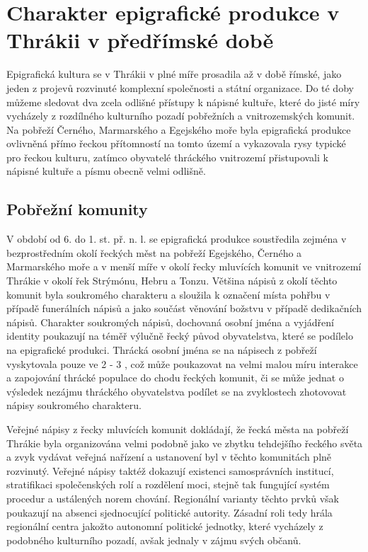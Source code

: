 \section[charakter-epigrafické-produkce-v-thrákii-v-předřímské-době]{Charakter epigrafické produkce v Thrákii v předřímské době}

Epigrafická kultura se v Thrákii v plné míře prosadila až v době římské, jako jeden z projevů rozvinuté komplexní společnosti a státní organizace. Do té doby můžeme sledovat dva zcela odlišné přístupy k nápisné kultuře, které do jisté míry vycházely z rozdílného kulturního pozadí pobřežních a vnitrozemských komunit. Na pobřeží Černého, Marmarského a Egejského moře byla epigrafická produkce ovlivněná přímo řeckou přítomností na tomto území a vykazovala rysy typické pro řeckou kulturu, zatímco obyvatelé thráckého vnitrozemí přistupovali k nápisné kultuře a písmu obecně velmi odlišně.

\subsection[pobřežní-komunity]{Pobřežní komunity}

V období od 6. do 1. st. př. n. l. se epigrafická produkce soustředila zejména v bezprostředním okolí řeckých měst na pobřeží Egejského, Černého a Marmarského moře a v menší míře v okolí řecky mluvících komunit ve vnitrozemí Thrákie v okolí řek Strýmónu, Hebru a Tonzu. Většina nápisů z okolí těchto komunit byla soukromého charakteru a sloužila k označení místa pohřbu v případě funerálních nápisů a jako součást věnování božstvu v případě dedikačních nápisů. Charakter soukromých nápisů, dochovaná osobní jména a vyjádření identity poukazují na téměř výlučně řecký původ obyvatelstva, které se podílelo na epigrafické produkci. Thrácká osobní jména se na nápisech z pobřeží vyskytovala pouze ve 2 - 3 , což může poukazovat na velmi malou míru interakce a zapojování thrácké populace do chodu řeckých komunit, či se může jednat o výsledek nezájmu thráckého obyvatelstva podílet se na zvyklostech zhotovovat nápisy soukromého charakteru.

Veřejné nápisy z řecky mluvících komunit dokládají, že řecká města na pobřeží Thrákie byla organizována velmi podobně jako ve zbytku tehdejšího řeckého světa a zvyk vydávat veřejná nařízení a ustanovení byl v těchto komunitách plně rozvinutý. Veřejné nápisy taktéž dokazují existenci samosprávních institucí, stratifikaci společenských rolí a rozdělení moci, stejně tak fungující systém procedur a ustálených norem chování. Regionální varianty těchto prvků však poukazují na absenci sjednocující politické autority. Zásadní roli tedy hrála regionální centra jakožto autonomní politické jednotky, které vycházely z podobného kulturního pozadí, avšak jednaly v zájmu svých občanů.

